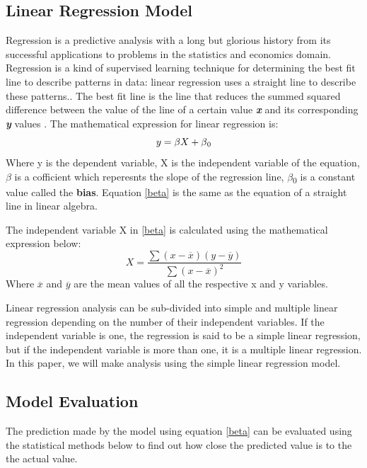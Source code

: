 \documentclass[conference]{IEEEtran}
\begin{document}
\subsection{Linear Regression Model}
Regression 
is a predictive analysis with a long but glorious history from its successful applications to problems in the statistics and economics domain. Regression is a kind of supervised learning technique for determining the best fit line to describe patterns in data: linear regression uses a straight line to describe these patterns.\cite{theobald2017machine}. The best fit line is the line that reduces the summed squared difference between the value of the line of a certain value \textbf{\textit{x}} and its corresponding \textbf{\textit{y}} values \cite{from main reference}. The mathematical expression for linear regression is:
	\begin{equation}
		y = \beta\label{beta}X + \beta\textsubscript{0}
	\end{equation}
	Where y is the dependent variable, X is the independent variable of the equation, $\beta$ is a cofficient which reperesnts the slope of the regression line, $\beta$\textsubscript{0} is a constant value called the \textbf{bias}. Equation \eqref{beta} is the same as the equation of a straight line in linear algebra.
	
	The independent variable X in \eqref{beta} is calculated using the mathematical expression below:
	\begin{equation}
		X = \frac{\sum{}(x-\overline{x})(y-\overline{y})}{\sum{}(x-\overline{x})^2}
	\end{equation}	
	Where $\overline{x}$ and $\overline{y}$ are the mean values of all the respective x and y variables.
	
	
Linear regression analysis can be sub-divided into simple and multiple linear regression depending on the number of their independent variables. If the independent variable is one, the regression is said to be a simple linear regression, but if the independent variable is more than one, it is a multiple linear regression. In this paper, we will make analysis using the simple linear regression model.

\subsection{Model Evaluation}
The prediction made by the model using equation \eqref{beta} can be evaluated using the statistical methods below to find out how close the predicted value is to the the actual value.
\end{document}

